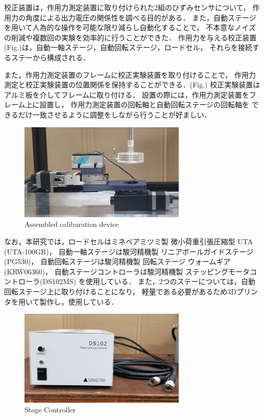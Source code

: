 \newpage

校正装置は，作用力測定装置に取り付けられた2組のひずみセンサについて，
作用力の角度による出力電圧の関係性を調べる目的がある．
また，自動ステージを用いて人為的な操作を可能な限り減らし自動化することで，
不本意なノイズの削減や複数回の実験を効率的に行うことができた．
作用力を与える校正装置(Fig.)は，自動一軸ステージ，自動回転ステージ，ロードセル，
それらを接続するステーから構成される．

また，作用力測定装置のフレームに校正実験装置を取り付けることで，
作用力測定と校正実験装置の位置関係を保持することができる．(Fig.)
校正実験装置はアルミ板を介してフレームに取り付ける．
設置の際には，作用力測定装置をフレーム上に設置し，
作用力測定装置の回転軸と自動回転ステージの回転軸を
できるだけ一致させるように調整をしながら行うことが好ましい．
\begin{figure}[htbp]
    \footnotesize
    \begin{center}
        \includegraphics[width=80mm]{images/22-3.png}
        \caption{Assembled calibaration device}
    \end{center}
\end{figure}

なお，本研究では，ロードセルはミネベアミツミ製 微小荷重引張圧縮型 UTA (UTA-100GR)，
自動一軸ステージは駿河精機製 リニアボールガイドステージ (PG530)，
自動回転ステージは駿河精機製 回転ステージ ウォームギア (KRW06360)，
自動ステージコントローラは駿河精機製 ステッピングモータコントローラ(DS102MS) を使用している．
また，2つのステーについては，自動回転ステージ上に取り付けることになり，
軽量である必要があるため3Dプリンタを用いて製作し，使用している．

\begin{figure}[htbp]
    \footnotesize
    \begin{center}
        \includegraphics[width=80mm]{images/22-4.png}
        \caption{Stage Controller}
    \end{center}
\end{figure}

